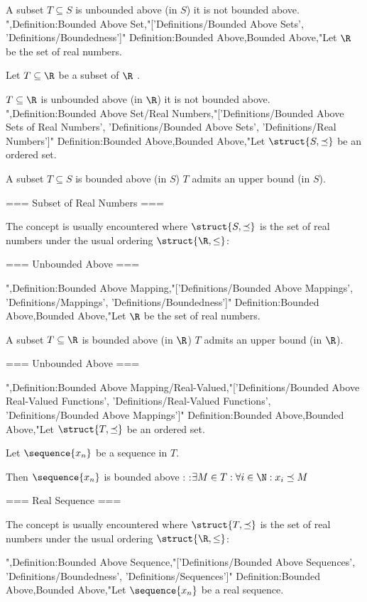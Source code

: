 A subset $T \subseteq S$ is unbounded above (in $S$)  it is not bounded above.
",Definition:Bounded Above Set,"['Definitions/Bounded Above Sets', 'Definitions/Boundedness']"
Definition:Bounded Above,Bounded Above,"Let $\R$ be the set of real numbers.

Let $T \subseteq \R$ be a subset of $\R$ .


$T \subseteq \R$ is unbounded above (in $\R$)  it is not bounded above.
",Definition:Bounded Above Set/Real Numbers,"['Definitions/Bounded Above Sets of Real Numbers', 'Definitions/Bounded Above Sets', 'Definitions/Real Numbers']"
Definition:Bounded Above,Bounded Above,"Let $\struct {S, \preceq}$ be an ordered set.


A subset $T \subseteq S$ is bounded above (in $S$)  $T$ admits an upper bound (in $S$).


=== Subset of Real Numbers ===

The concept is usually encountered where $\struct {S, \preceq}$ is the set of real numbers under the usual ordering $\struct {\R, \le}$:



=== Unbounded Above ===

",Definition:Bounded Above Mapping,"['Definitions/Bounded Above Mappings', 'Definitions/Mappings', 'Definitions/Boundedness']"
Definition:Bounded Above,Bounded Above,"Let $\R$ be the set of real numbers.

A subset $T \subseteq \R$ is bounded above (in $\R$)  $T$ admits an upper bound (in $\R$).


=== Unbounded Above ===

",Definition:Bounded Above Mapping/Real-Valued,"['Definitions/Bounded Above Real-Valued Functions', 'Definitions/Real-Valued Functions', 'Definitions/Bounded Above Mappings']"
Definition:Bounded Above,Bounded Above,"Let $\struct {T, \preceq}$ be an ordered set.

Let $\sequence {x_n}$ be a sequence in $T$.


Then $\sequence {x_n}$ is bounded above :
:$\exists M \in T: \forall i \in \N: x_i \preceq M$


=== Real Sequence ===

The concept is usually encountered where $\struct {T, \preceq}$ is the set of real numbers under the usual ordering $\struct {\R, \le}$:

",Definition:Bounded Above Sequence,"['Definitions/Bounded Above Sequences', 'Definitions/Boundedness', 'Definitions/Sequences']"
Definition:Bounded Above,Bounded Above,"Let $\sequence {x_n}$ be a real sequence.


